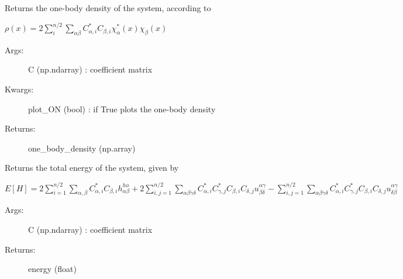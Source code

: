 \documentclass[letterpaper,10pt,english]{sphinxmanual}
\begin{document}
\begin{fulllineitems}
\begin{description}
\end{description}

\begin{fulllineitems}
\label{\detokenize{index:do.RHF.eval_one_body_density}}
Returns the one-body density of the system, according to

\(\rho(x) = 2 \sum_i^{n/2} \sum_{\alpha\beta} C_{\alpha,i}^* C_{\beta,i} \chi_{\alpha}^*(x) \chi_{\beta}(x)\)
\begin{description}
\item[{Args:}] \leavevmode
C (np.ndarray) : coefficient matrix

\item[{Kwargs:}] \leavevmode
plot\_ON (bool) : if True plots the one-body density

\item[{Returns:}] \leavevmode
one\_body\_density (np.array)

\end{description}

\end{fulllineitems}


\begin{fulllineitems}
\label{\detokenize{index:do.RHF.evaluate_total_energy}}
Returns the total energy of the system, given by

\(E[H] = 2\sum_{i=1}^{n/2} \sum_{\alpha,\beta} C_{\alpha,i}^* C_{\beta,i} h_{\alpha\beta}^{ho} + 2 \sum_{i,j=1}^{n/2} \sum_{\alpha\beta\gamma\delta} C_{\alpha,i}^* C_{\gamma,j}^* C_{\beta,i} C_{\delta,j}  u^{\alpha\gamma}_{\beta\delta} - \sum_{i,j=1}^{n/2} \sum_{\alpha\beta\gamma\delta} C_{\alpha,i}^* C_{\gamma,j}^* C_{\beta,i} C_{\delta,j}  u^{\alpha\gamma}_{\delta\beta}\)
\begin{description}
\item[{Args:}] \leavevmode
C (np.ndarray) : coefficient matrix

\item[{Returns:}] \leavevmode
energy (float)

\end{description}


\end{fulllineitems}
\end{fulllineitems}
\end{document}
